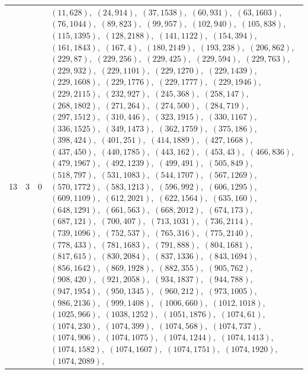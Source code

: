 \documentclass[11pt]{article}
\begin{document}
\begin{longtable}{@{}rrl>{\raggedright\arraybackslash}p{}@{}}
13 & 3 & $0$ & $(11,628)$,\allowbreak\ $(24,914)$,\allowbreak\ $(37,1538)$,\allowbreak\ $(60,931)$,\allowbreak\ $(63,1603)$,\allowbreak\ $(76,1044)$,\allowbreak\ $(89,823)$,\allowbreak\ $(99,957)$,\allowbreak\ $(102,940)$,\allowbreak\ $(105,838)$,\allowbreak\ $(115,1395)$,\allowbreak\ $(128,2188)$,\allowbreak\ $(141,1122)$,\allowbreak\ $(154,394)$,\allowbreak\ $(161,1843)$,\allowbreak\ $(167,4)$,\allowbreak\ $(180,2149)$,\allowbreak\ $(193,238)$,\allowbreak\ $(206,862)$,\allowbreak\ $(229,87)$,\allowbreak\ $(229,256)$,\allowbreak\ $(229,425)$,\allowbreak\ $(229,594)$,\allowbreak\ $(229,763)$,\allowbreak\ $(229,932)$,\allowbreak\ $(229,1101)$,\allowbreak\ $(229,1270)$,\allowbreak\ $(229,1439)$,\allowbreak\ $(229,1608)$,\allowbreak\ $(229,1776)$,\allowbreak\ $(229,1777)$,\allowbreak\ $(229,1946)$,\allowbreak\ $(229,2115)$,\allowbreak\ $(232,927)$,\allowbreak\ $(245,368)$,\allowbreak\ $(258,147)$,\allowbreak\ $(268,1802)$,\allowbreak\ $(271,264)$,\allowbreak\ $(274,500)$,\allowbreak\ $(284,719)$,\allowbreak\ $(297,1512)$,\allowbreak\ $(310,446)$,\allowbreak\ $(323,1915)$,\allowbreak\ $(330,1167)$,\allowbreak\ $(336,1525)$,\allowbreak\ $(349,1473)$,\allowbreak\ $(362,1759)$,\allowbreak\ $(375,186)$,\allowbreak\ $(398,424)$,\allowbreak\ $(401,251)$,\allowbreak\ $(414,1889)$,\allowbreak\ $(427,1668)$,\allowbreak\ $(437,450)$,\allowbreak\ $(440,1785)$,\allowbreak\ $(443,162)$,\allowbreak\ $(453,43)$,\allowbreak\ $(466,836)$,\allowbreak\ $(479,1967)$,\allowbreak\ $(492,1239)$,\allowbreak\ $(499,491)$,\allowbreak\ $(505,849)$,\allowbreak\ $(518,797)$,\allowbreak\ $(531,1083)$,\allowbreak\ $(544,1707)$,\allowbreak\ $(567,1269)$,\allowbreak\ $(570,1772)$,\allowbreak\ $(583,1213)$,\allowbreak\ $(596,992)$,\allowbreak\ $(606,1295)$,\allowbreak\ $(609,1109)$,\allowbreak\ $(612,2021)$,\allowbreak\ $(622,1564)$,\allowbreak\ $(635,160)$,\allowbreak\ $(648,1291)$,\allowbreak\ $(661,563)$,\allowbreak\ $(668,2012)$,\allowbreak\ $(674,173)$,\allowbreak\ $(687,121)$,\allowbreak\ $(700,407)$,\allowbreak\ $(713,1031)$,\allowbreak\ $(736,2114)$,\allowbreak\ $(739,1096)$,\allowbreak\ $(752,537)$,\allowbreak\ $(765,316)$,\allowbreak\ $(775,2140)$,\allowbreak\ $(778,433)$,\allowbreak\ $(781,1683)$,\allowbreak\ $(791,888)$,\allowbreak\ $(804,1681)$,\allowbreak\ $(817,615)$,\allowbreak\ $(830,2084)$,\allowbreak\ $(837,1336)$,\allowbreak\ $(843,1694)$,\allowbreak\ $(856,1642)$,\allowbreak\ $(869,1928)$,\allowbreak\ $(882,355)$,\allowbreak\ $(905,762)$,\allowbreak\ $(908,420)$,\allowbreak\ $(921,2058)$,\allowbreak\ $(934,1837)$,\allowbreak\ $(944,788)$,\allowbreak\ $(947,1954)$,\allowbreak\ $(950,1345)$,\allowbreak\ $(960,212)$,\allowbreak\ $(973,1005)$,\allowbreak\ $(986,2136)$,\allowbreak\ $(999,1408)$,\allowbreak\ $(1006,660)$,\allowbreak\ $(1012,1018)$,\allowbreak\ $(1025,966)$,\allowbreak\ $(1038,1252)$,\allowbreak\ $(1051,1876)$,\allowbreak\ $(1074,61)$,\allowbreak\ $(1074,230)$,\allowbreak\ $(1074,399)$,\allowbreak\ $(1074,568)$,\allowbreak\ $(1074,737)$,\allowbreak\ $(1074,906)$,\allowbreak\ $(1074,1075)$,\allowbreak\ $(1074,1244)$,\allowbreak\ $(1074,1413)$,\allowbreak\ $(1074,1582)$,\allowbreak\ $(1074,1607)$,\allowbreak\ $(1074,1751)$,\allowbreak\ $(1074,1920)$,\allowbreak\ $(1074,2089)$,\allowbreak\ 
\end{longtable}
\end{document}
